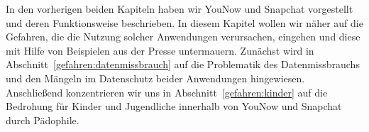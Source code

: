 In den vorherigen beiden Kapiteln haben wir YouNow und Snapchat vorgestellt und
deren Funktionsweise beschrieben. In diesem Kapitel wollen wir n\"aher auf die
Gefahren, die die Nutzung solcher Anwendungen verursachen, eingehen und diese
mit Hilfe von Beispielen aus der Presse untermauern. Zun\"achst wird in
Abschnitt~\ref{gefahren:datenmissbrauch} auf die Problematik des
Datenmissbrauchs und den M\"angeln im Datenschutz beider Anwendungen
hingewiesen. Anschlie{\ss}end konzentrieren wir uns in
Abschnitt~\ref{gefahren:kinder} auf die Bedrohung f\"ur Kinder und Jugendliche
innerhalb von YouNow und Snapchat durch P\"adophile.
